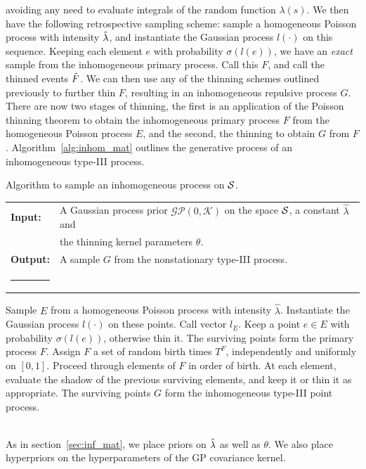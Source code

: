 \documentclass{statsoc}
\begin{document}
avoiding any need to evaluate integrals of the random function $\lambda(s)$. We then have the
following retrospective sampling scheme: sample a homogeneous Poisson process with intensity $\hat{\lambda}$, and instantiate the Gaussian process $l(\cdot)$ on this sequence.
Keeping each element $e$ with probability ${\sigma(l(e))}$, 
we have an \emph{exact} sample from the inhomogeneous primary process. Call this $F$, and call the thinned events $\tilde{F}$. 
We can then use any of the \matern thinning schemes outlined previously to further thin $F$, resulting in an inhomogeneous repulsive process $G$.
There are now two stages of thinning, the first is an application of the 
Poisson thinning theorem to obtain the inhomogeneous primary process $F$ from the homogeneous Poisson process $E$, and the second, the \matern 
thinning to obtain $G$ from $F$. Algorithm~\ref{alg:inhom_mat} outlines the generative process of an inhomogeneous \matern type-III process.
\begin{algorithm}
\caption{Algorithm to sample an inhomogeneous \matern process on ${\mathcal S}$.} \label{alg:inhom_mat}
\vspace{-.1in}
\begin{tabular}{p{1.4cm}p{12.2cm}}
\textbf{Input:}  & A Gaussian process prior $\mathcal{GP}(0, \mathcal{K})$ on the space ${\mathcal S}$, a constant $\hat{\lambda}$ and \\
                 & the thinning kernel parameters $\theta$. \\
\textbf{Output:} & A sample $G$ from the nonstationary \matern type-III process. \\
\rule[0.5ex]{33em}{0.55pt}
\end{tabular}
\begin{algorithmic}[1]
\State Sample $E$ from a homogeneous Poisson process with intensity $\hat{\lambda}$.
\State Instantiate the Gaussian process $l(\cdot)$ on these points. Call vector $l_E$.
\State %
       Keep a point $e \in E$ with probability $\sigma(l(e))$, otherwise thin it. The surviving points form the primary process $F$.
\State Assign $F$ a set of random birth times $T^F$, independently and uniformly on $[0,1]$.
\State Proceed through elements of $F$ in order of birth. At each element, evaluate the shadow of the previous surviving elements,
       and keep it or thin it as appropriate.
\State The surviving points $G$ form the inhomogeneous \matern type-III point process.
\vspace{-.1in}
\end{algorithmic}
\end{algorithm}
\\As in section~\ref{sec:inf_mat}, we place priors on $\hat{\lambda}$ as well as $\theta$. We also place hyperpriors on the hyperparameters of the GP covariance kernel. 
\end{document}
